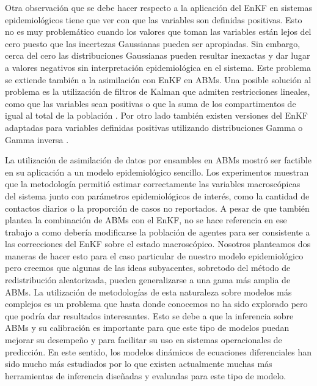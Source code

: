 Otra observación que se debe hacer respecto a la aplicación del EnKF en sistemas epidemiológicos tiene que ver con que las variables son definidas positivas. Esto no es muy problemático cuando los valores que toman las variables están lejos del cero puesto que las incertezas Gaussianas pueden ser apropiadas. Sin embargo, cerca del cero las distribuciones Gaussianas pueden resultar inexactas y dar lugar a valores negativos sin interpretación epidemiológica en el sistema. Este problema se extiende también a la asimilación con EnKF en ABMs. Una posible solución al problema es la utilización de filtros de Kalman que admiten restricciones lineales, como que las variables sean positivas o que la suma de los compartimentos de igual al total de la población \citep{Gupta2007}. Por otro lado también existen versiones del EnKF adaptadas para variables definidas positivas utilizando distribuciones Gamma o Gamma inversa \citep{Bishop2016}.

La utilización de asimilación de datos por ensambles en ABMs mostró ser factible en su aplicación a un modelo epidemiológico sencillo. Los experimentos muestran que la metodología permitió estimar correctamente las variables macroscópicas del sistema junto con parámetros epidemiológicos de interés, como la cantidad de contactos diarios o la proporción de casos no reportados. A pesar de que \cite{Ward2016} también plantea la combinación de ABMs con el EnKF, no se hace referencia en ese trabajo a como debería modificarse la población de agentes para ser consistente a las correcciones del EnKF sobre el estado macroscópico. Nosotros planteamos dos maneras de hacer esto para el caso particular de nuestro modelo epidemiológico pero creemos que algunas de las ideas subyacentes, sobretodo del método de redistribución aleatorizada, pueden generalizarse a una gama más amplia de ABMs. La utilización de metodologías de esta naturaleza sobre modelos más complejos es un problema que hasta donde conocemos no ha sido explorado pero que podría dar resultados interesantes. Esto se debe a que la inferencia sobre ABMs y su calibración es importante para que este tipo de modelos puedan mejorar su desempeño y para facilitar su uso en sistemas operacionales de predicción. En este sentido, los modelos dinámicos de ecuaciones diferenciales han sido mucho más estudiados por lo que existen actualmente muchas más herramientas de inferencia diseñadas y evaluadas para este tipo de modelo.

